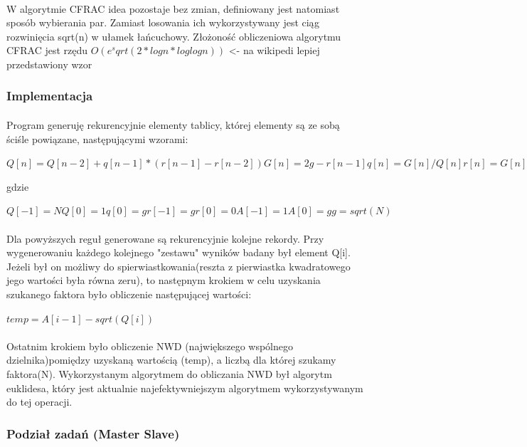 \documentclass{article}
\begin{document}
\paragraph{}W algorytmie CFRAC idea pozostaje bez zmian, definiowany jest natomiast sposób wybierania par. Zamiast losowania ich wykorzystywany jest ciąg rozwinięcia sqrt(n) w ułamek łańcuchowy. Złożoność obliczeniowa algorytmu CFRAC jest rzędu $O(e^sqrt(2* logn * loglog n))$ <- na wikipedi lepiej przedstawiony wzor

\subsubsection{Implementacja\cite{cfracimpl}}
\paragraph{}Program generuję rekurencyjnie elementy tablicy, której elementy są ze sobą ściśle powiązane, następującymi wzorami:

$Q[n] = Q[n-2] + q[n-1] * (r[n-1] - r[n-2]) G[n] = 2g - r[n-1] q[n] = G[n]/Q[n] r[n] = G[n] - q[n]Q[n] A[n] = q[n]*A[n-1] + A[n-2]modN$

gdzie

$Q[-1]= N Q[0] = 1 q[0] = g r[-1] = g r[0] = 0 A[-1]= 1 A[0] = g g = sqrt(N)$
\paragraph{}Dla powyższych reguł generowane są rekurencyjnie kolejne rekordy. Przy wygenerowaniu każdego kolejnego "zestawu" wyników badany był element Q[i]. Jeżeli był on możliwy do spierwiastkowania(reszta z pierwiastka kwadratowego jego wartości była równa zeru), to następnym krokiem w celu uzyskania szukanego faktora było obliczenie następującej wartości:

$temp = A[i-1] - sqrt(Q[i])$

\paragraph{}Ostatnim krokiem było obliczenie NWD (największego wspólnego dzielnika)pomiędzy uzyskaną wartością (temp), a liczbą dla której szukamy faktora(N). Wykorzystanym algorytmem do obliczania NWD był algorytm euklidesa, który jest aktualnie najefektywniejszym algorytmem wykorzystywanym do tej operacji.

\subsubsection{Podział zadań (Master Slave)}
\end{document}
